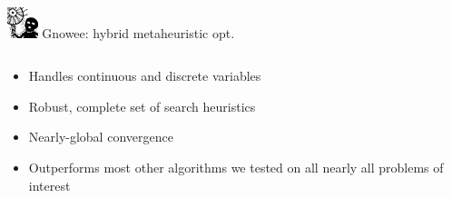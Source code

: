 \documentclass[xcolor=x11names,compress,handout]{beamer}
\renewcommand{\(}{\begin{columns}}
\renewcommand{\)}{\end{columns}}
\newcommand{\<}[1]{\begin{column}{#1}}
\renewcommand{\>}{\end{column}}
\begin{document}
\begin{frame}{\includegraphics[width=0.35in]{../figs/Gnowee.png} \hspace{0.25cm}  Gnowee: hybrid metaheuristic opt.}
  \begin{columns}
    \begin{column}{0.6\linewidth}
      \vspace{-0.75cm}
      \begin{itemize}
        \item Handles continuous and discrete variables \newline
        \item Robust, complete set of search heuristics \newline
        \item Nearly-global convergence \newline
        \item Outperforms most other algorithms we tested on all nearly all problems of interest
      \end{itemize} 
    \end{column}
    

\end{columns}
\end{frame}
\end{document}
